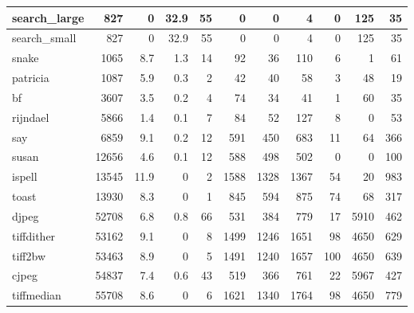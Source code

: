 \begin{tabular}{|l|r|r|r|r|r|r|r|r|r|r|}
\hline
 search\_large    &            827 &      0   &   32.9 &   55 &      0 &          0 &            4 &     0 &   125 &    35 \\
\hline
 search\_small    &            827 &      0   &   32.9 &   55 &      0 &          0 &            4 &     0 &   125 &    35 \\
\hline
 snake           &           1065 &      8.7 &    1.3 &   14 &     92 &         36 &          110 &     6 &     1 &    61 \\
\hline
 patricia        &           1087 &      5.9 &    0.3 &    2 &     42 &         40 &           58 &     3 &    48 &    19 \\
\hline
 bf              &           3607 &      3.5 &    0.2 &    4 &     74 &         34 &           41 &     1 &    60 &    35 \\
\hline
 rijndael        &           5866 &      1.4 &    0.1 &    7 &     84 &         52 &          127 &     8 &     0 &    53 \\
\hline
 say             &           6859 &      9.1 &    0.2 &   12 &    591 &        450 &          683 &    11 &    64 &   366 \\
\hline
 susan           &          12656 &      4.6 &    0.1 &   12 &    588 &        498 &          502 &     0 &     0 &   100 \\
\hline
 ispell          &          13545 &     11.9 &    0   &    2 &   1588 &       1328 &         1367 &    54 &    20 &   983 \\
\hline
 toast           &          13930 &      8.3 &    0   &    1 &    845 &        594 &          875 &    74 &    68 &   317 \\
\hline
 djpeg           &          52708 &      6.8 &    0.8 &   66 &    531 &        384 &          779 &    17 &  5910 &   462 \\
\hline
 tiffdither      &          53162 &      9.1 &    0   &    8 &   1499 &       1246 &         1651 &    98 &  4650 &   629 \\
\hline
 tiff2bw         &          53463 &      8.9 &    0   &    5 &   1491 &       1240 &         1657 &   100 &  4650 &   639 \\
\hline
 cjpeg           &          54837 &      7.4 &    0.6 &   43 &    519 &        366 &          761 &    22 &  5967 &   427 \\
\hline
 tiffmedian      &          55708 &      8.6 &    0   &    6 &   1621 &       1340 &         1764 &    98 &  4650 &   779 \\
\hline
\end{tabular}

